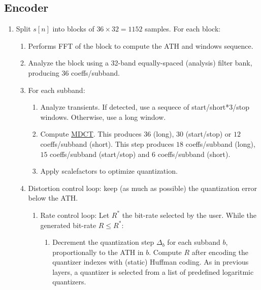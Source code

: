 \subsection{Encoder}
\begin{enumerate}
\item Split $s[n]$ into blocks of $36\times 32=1152$ samples. For each
  block:
  \begin{enumerate}
  \item Performs FFT of the block to compute the ATH and windows
    sequence.
  \item Analyze the block using a 32-band equally-spaced (analysis)
    filter bank, producing $36$ coeffs/subband.
  \item For each subband:
    \begin{enumerate}
    \item Analyze transients. If detected, use a sequece of
      start/short*3/stop windows. Otherwise, use a long window.
    \item Compute
      \href{https://en.wikipedia.org/wiki/Modified_discrete_cosine_transform}{MDCT}. This
      produces $36$ (long), $30$ (start/stop) or $12$ coeffs/subband
      (short). This step produces $18$ coeffs/subband (long), $15$
      coeffs/subband (start/stop) and $6$ coeffs/subband (short).
      \item Apply scalefactors to optimize quantization.
     \end{enumerate}
   \item Distortion control loop: keep (as much as possible) the
     quantization error below the ATH.
     \begin{enumerate}
     \item Rate control loop: Let $R^*$ the bit-rate selected by the
       user. While the generated bit-rate $R\leq R^*$:
       \begin{enumerate}
       \item Decrement the quantization step $\Delta_b$ for each
         subband $b$, proportionally to the ATH in $b$. Compute $R$
         after encoding the quantizer indexes with (static) Huffman
         coding. As in previous layers, a quantizer is selected from a
         list of predefined logaritmic quantizers.
       \end{enumerate}
     \end{enumerate}
  \end{enumerate}
\end{enumerate}

